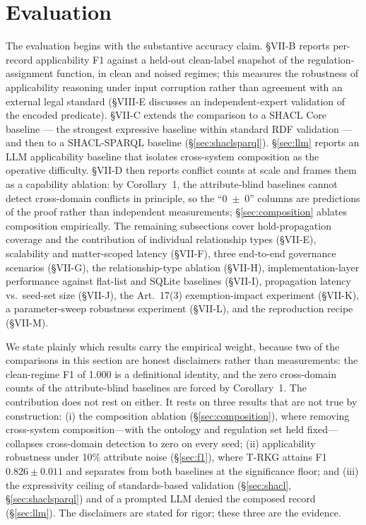\documentclass{ieeeaccess}
\begin{document}
\section{Evaluation}
\label{sec:eval}

The evaluation begins with the substantive accuracy claim. §VII-B reports per-record applicability F1 against a held-out clean-label snapshot of the regulation-assignment function, in clean and noised regimes; this measures the robustness of applicability reasoning under input corruption rather than agreement with an external legal standard (§VIII-E discusses an independent-expert validation of the encoded predicate). §VII-C extends the comparison to a SHACL Core baseline --- the strongest expressive baseline within standard RDF validation --- and then to a SHACL-SPARQL baseline (§\ref{sec:shaclsparql}). §\ref{sec:llm} reports an LLM applicability baseline that isolates cross-system composition as the operative difficulty. §VII-D then reports conflict counts at scale and frames them as a capability ablation: by Corollary~1, the attribute-blind baselines cannot detect cross-domain conflicts in principle, so the ``0~$\pm$~0'' columns are predictions of the proof rather than independent measurements; §\ref{sec:composition} ablates composition empirically. The remaining subsections cover hold-propagation coverage and the contribution of individual relationship types (§VII-E), scalability and matter-scoped latency (§VII-F), three end-to-end governance scenarios (§VII-G), the relationship-type ablation (§VII-H), implementation-layer performance against flat-list and SQLite baselines (§VII-I), propagation latency vs.\ seed-set size (§VII-J), the Art.~17(3) exemption-impact experiment (§VII-K), a parameter-sweep robustness experiment (§VII-L), and the reproduction recipe (§VII-M).

We state plainly which results carry the empirical weight, because two of the comparisons in this section are honest disclaimers rather than measurements: the clean-regime F1 of 1.000 is a definitional identity, and the zero cross-domain counts of the attribute-blind baselines are forced by Corollary~1. The contribution does not rest on either. It rests on three results that are not true by construction: (i) the composition ablation (§\ref{sec:composition}), where removing cross-system composition---with the ontology and regulation set held fixed---collapses cross-domain detection to zero on every seed; (ii) applicability robustness under 10\% attribute noise (§\ref{sec:f1}), where T-RKG attains F1 $0.826 \pm 0.011$ and separates from both baselines at the significance floor; and (iii) the expressivity ceiling of standards-based validation (§\ref{sec:shacl}, §\ref{sec:shaclsparql}) and of a prompted LLM denied the composed record (§\ref{sec:llm}). The disclaimers are stated for rigor; these three are the evidence.
\end{document}
